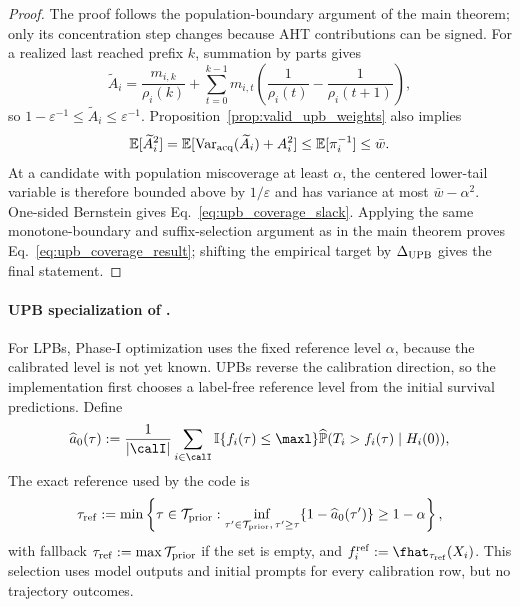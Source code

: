 \begin{proof}
The proof follows the population-boundary argument of the main theorem; only
its concentration step changes because AHT contributions can be signed.
For a realized last reached prefix \(k\), summation by parts gives
\begin{equation}
    \widetilde A_i
    =\frac{m_{i,k}}{\rho_i(k)}
      +\sum_{t=0}^{k-1}m_{i,t}
        \left(\frac{1}{\rho_i(t)}-\frac{1}{\rho_i(t+1)}\right),
\end{equation}
so \(1-\varepsilon^{-1}\leq\widetilde A_i\leq\varepsilon^{-1}\).
Proposition~\ref{prop:valid_upb_weights} also implies
\begin{equation}
    \mathbb E[\widetilde A_i^2]
    =\mathbb E[\operatorname{Var}_{\rm acq}(\widetilde A_i)+A_i^2]
    \leq\mathbb E[\pi_i^{-1}]\leq\bar w.
\end{equation}
At a candidate with population miscoverage at least \(\alpha\), the centered
lower-tail variable is therefore bounded above by \(1/\varepsilon\) and has
variance at most \(\bar w-\alpha^2\). One-sided Bernstein gives
Eq.~\eqref{eq:upb_coverage_slack}. Applying the same monotone-boundary and
suffix-selection argument as in the main theorem proves
Eq.~\eqref{eq:upb_coverage_result}; shifting the empirical target by
\(\Delta_{\rm UPB}\) gives the final statement.
\end{proof}

\paragraph{UPB specialization of \ttmethod.}
For LPBs, Phase-I optimization uses the fixed reference level \(\alpha\),
because the calibrated level is not yet known. UPBs reverse the calibration
direction, so the implementation first chooses a label-free reference level
from the initial survival predictions. Define
\begin{equation}
    \widehat a_0(\tau)
    :=\frac{1}{|\calI|}\sum_{i\in\calI}
      \mathbb I\{f_i(\tau)\leq\maxl\}
      \widehat{\mathbb P}(T_i>f_i(\tau)\mid H_i(0)),
\end{equation}
The exact reference used by the code is
\begin{equation}
    \tau_{\rm ref}
    :=\min\left\{\tau\in\mathcal T_{\rm prior}:
      \inf_{\tau'\in\mathcal T_{\rm prior},\,\tau'\geq\tau}
      \{1-\widehat a_0(\tau')\}\geq1-\alpha\right\},
    \label{eq:upb_reference_level}
\end{equation}
with fallback \(\tau_{\rm ref}:=\max\mathcal T_{\rm prior}\) if the set is
empty, and \(f_i^{\rm ref}:=\fhat_{\tau_{\rm ref}}(X_i)\). This selection
uses model outputs and initial prompts for every calibration row, but no
trajectory outcomes.

